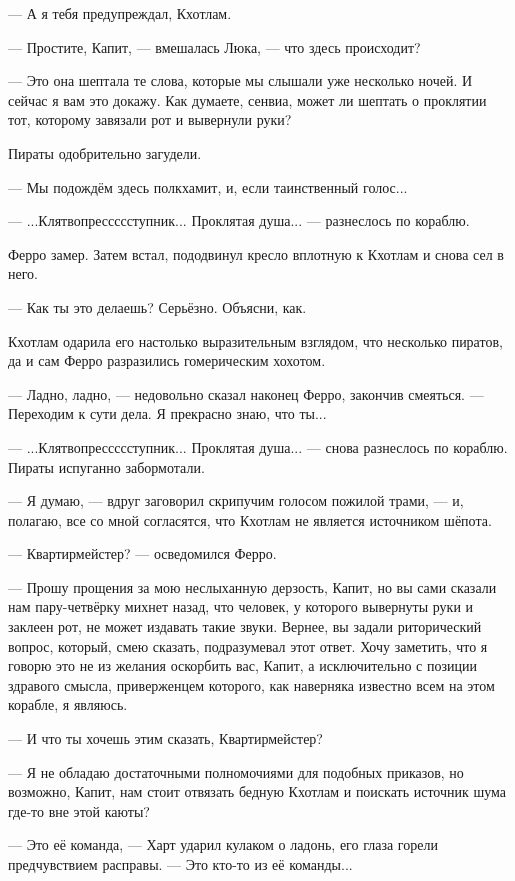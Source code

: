 --- А я тебя предупреждал, Кхотлам.

--- Простите, Капит, --- вмешалась Люка, --- что здесь происходит?

--- Это она шептала те слова, которые мы слышали уже несколько ночей.
И сейчас я вам это докажу.
Как думаете, сенвиа, может ли шептать о проклятии тот, которому завязали рот и вывернули руки?

Пираты одобрительно загудели.

--- Мы подождём здесь полкхамит, и, если таинственный голос...

--- ...Клятвопрессссступник... Проклятая душа... --- разнеслось по кораблю.

Ферро замер.
Затем встал, пододвинул кресло вплотную к Кхотлам и снова сел в него.

--- Как ты это делаешь?
Серьёзно.
Объясни, как.

Кхотлам одарила его настолько выразительным взглядом, что несколько пиратов, да и сам Ферро разразились гомерическим хохотом.

--- Ладно, ладно, --- недовольно сказал наконец Ферро, закончив смеяться.
--- Переходим к сути дела.
Я прекрасно знаю, что ты...

--- ...Клятвопрессссступник... Проклятая душа... --- снова разнеслось по кораблю.
Пираты испуганно забормотали.

--- Я думаю, --- вдруг заговорил скрипучим голосом пожилой трами, --- и, полагаю, все со мной согласятся, что Кхотлам не является источником шёпота.

--- Квартирмейстер? --- осведомился Ферро.

--- Прошу прощения за мою неслыханную дерзость, Капит, но вы сами сказали нам пару-четвёрку михнет назад, что человек, у которого вывернуты руки и заклеен рот, не может издавать такие звуки.
Вернее, вы задали риторический вопрос, который, смею сказать, подразумевал этот ответ.
Хочу заметить, что я говорю это не из желания оскорбить вас, Капит, а исключительно с позиции здравого смысла, приверженцем которого, как наверняка известно всем на этом корабле, я являюсь.

--- И что ты хочешь этим сказать, Квартирмейстер?

--- Я не обладаю достаточными полномочиями для подобных приказов, но возможно, Капит, нам стоит отвязать бедную Кхотлам и поискать источник шума где-то вне этой каюты?

--- Это её команда, --- Харт ударил кулаком о ладонь, его глаза горели предчувствием расправы.
--- Это кто-то из её команды...


